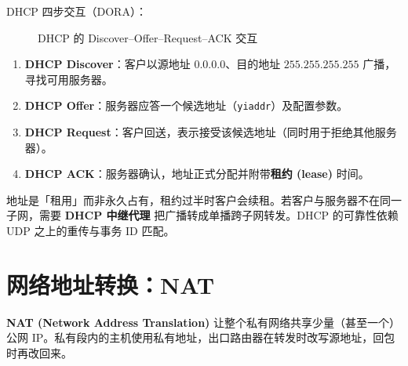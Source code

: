\noindent DHCP 四步交互（DORA）：

\begin{figure}[H]
\centering
{}
\caption{DHCP 的 Discover--Offer--Request--ACK 交互}
\label{fig:dhcp}
\end{figure}

\begin{enumerate}
    \item \textbf{DHCP Discover}：客户以源地址 $0.0.0.0$、目的地址 $255.255.255.255$ 广播，寻找可用服务器。
    \item \textbf{DHCP Offer}：服务器应答一个候选地址（\texttt{yiaddr}）及配置参数。
    \item \textbf{DHCP Request}：客户回送，表示接受该候选地址（同时用于拒绝其他服务器）。
    \item \textbf{DHCP ACK}：服务器确认，地址正式分配并附带\textbf{租约 (lease)} 时间。
\end{enumerate}

\noindent 地址是「租用」而非永久占有，租约过半时客户会续租。若客户与服务器不在同一子网，需要 \textbf{DHCP 中继代理} 把广播转成单播跨子网转发。DHCP 的可靠性依赖 UDP 之上的重传与事务 ID 匹配。

\section{网络地址转换：NAT}

\textbf{NAT (Network Address Translation)} 让整个私有网络共享少量（甚至一个）公网 IP。私有段内的主机使用私有地址，出口路由器在转发时改写源地址，回包时再改回来。

